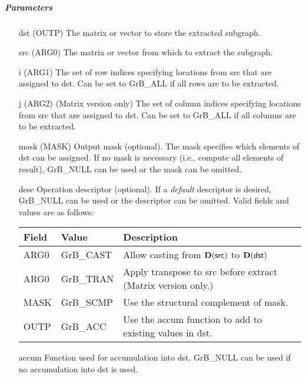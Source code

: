\subparagraph{Parameters}

\begin{itemize}[leftmargin=1in]
    \item[{\sf dst}]   (OUTP) The matrix or vector to store the extracted subgraph.
    \item[{\sf src}]   (ARG0) The matrix or vector from which to extract the subgraph.
    \item[{\sf i}]     (ARG1) The set of row indices specifying locations from src that
                              are assigned to dst. Can
                              be set to {\sf GrB\_ALL} if all rows are
                              to be extracted.
    \item[{\sf j}]     (ARG2) (Matrix version only) The set of column indices specifying
                              locations from src that are assigned to dst. Can
                              be set to {\sf GrB\_ALL} if all columns are
                              to be extracted.

    \item[{\sf mask}]  (MASK) Output mask (optional). The mask
    specifies which elements of {\sf dst} can be assigned.
    If no mask is necessary (i.e., compute all elements of result),
    {\sf GrB\_NULL} can be used or the mask can be omitted.

    \item[{\sf desc}]   Operation descriptor (optional). If a
    \emph{default} descriptor is desired, {\sf GrB\_NULL} can be
    used or the descriptor can be omitted.  Valid fields and values are as follows: \\
    \begin{tabular}{lll}
    Field  & Value & Description \\
    \hline
    {\sf ARG0} & {\sf GrB\_CAST} & Allow casting from $\bold{D}({\sf src})$ to $\bold{D}({\sf dst})$ \\
    {\sf ARG0} & {\sf GrB\_TRAN} & Apply transpose to {\sf src} before extract (Matrix version only.) \\
    {\sf MASK} & {\sf GrB\_SCMP} & Use the structural complement of {\sf mask}. \\
    {\sf OUTP}& {\sf GrB\_ACC}  & Use the {\sf accum} function to add to existing values in {\sf dst}.\\
    \end{tabular}

    \item[{\sf accum}] Function used for accumulation into dst.  {\sf GrB\_NULL}
                       can be used if no accumulation into dst is used.
\end{itemize}

